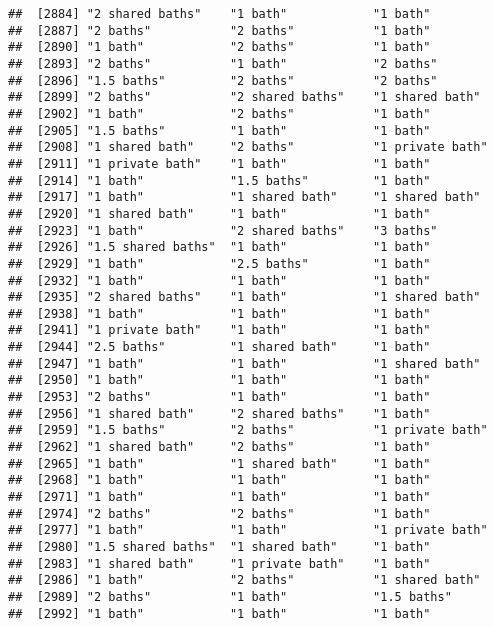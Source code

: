 \documentclass[
]{article}
\begin{document}
\begin{verbatim}
##  [2884] "2 shared baths"    "1 bath"            "1 bath"           
##  [2887] "2 baths"           "2 baths"           "1 bath"           
##  [2890] "1 bath"            "2 baths"           "1 bath"           
##  [2893] "2 baths"           "1 bath"            "2 baths"          
##  [2896] "1.5 baths"         "2 baths"           "2 baths"          
##  [2899] "2 baths"           "2 shared baths"    "1 shared bath"    
##  [2902] "1 bath"            "2 baths"           "1 bath"           
##  [2905] "1.5 baths"         "1 bath"            "1 bath"           
##  [2908] "1 shared bath"     "2 baths"           "1 private bath"   
##  [2911] "1 private bath"    "1 bath"            "1 bath"           
##  [2914] "1 bath"            "1.5 baths"         "1 bath"           
##  [2917] "1 bath"            "1 shared bath"     "1 shared bath"    
##  [2920] "1 shared bath"     "1 bath"            "1 bath"           
##  [2923] "1 bath"            "2 shared baths"    "3 baths"          
##  [2926] "1.5 shared baths"  "1 bath"            "1 bath"           
##  [2929] "1 bath"            "2.5 baths"         "1 bath"           
##  [2932] "1 bath"            "1 bath"            "1 bath"           
##  [2935] "2 shared baths"    "1 bath"            "1 shared bath"    
##  [2938] "1 bath"            "1 bath"            "1 bath"           
##  [2941] "1 private bath"    "1 bath"            "1 bath"           
##  [2944] "2.5 baths"         "1 shared bath"     "1 bath"           
##  [2947] "1 bath"            "1 bath"            "1 shared bath"    
##  [2950] "1 bath"            "1 bath"            "1 bath"           
##  [2953] "2 baths"           "1 bath"            "1 bath"           
##  [2956] "1 shared bath"     "2 shared baths"    "1 bath"           
##  [2959] "1.5 baths"         "2 baths"           "1 private bath"   
##  [2962] "1 shared bath"     "2 baths"           "1 bath"           
##  [2965] "1 bath"            "1 shared bath"     "1 bath"           
##  [2968] "1 bath"            "1 bath"            "1 bath"           
##  [2971] "1 bath"            "1 bath"            "1 bath"           
##  [2974] "2 baths"           "2 baths"           "1 bath"           
##  [2977] "1 bath"            "1 bath"            "1 private bath"   
##  [2980] "1.5 shared baths"  "1 shared bath"     "1 bath"           
##  [2983] "1 shared bath"     "1 private bath"    "1 bath"           
##  [2986] "1 bath"            "2 baths"           "1 shared bath"    
##  [2989] "2 baths"           "1 bath"            "1.5 baths"        
##  [2992] "1 bath"            "1 bath"            "1 bath"           

\end{verbatim}
\end{document}
